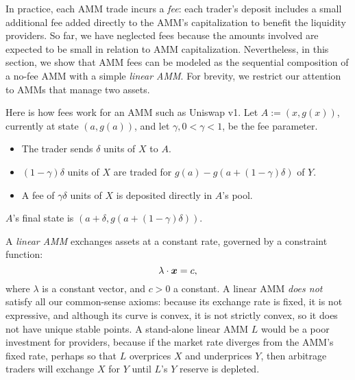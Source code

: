 In practice, each AMM trade incurs a \emph{fee}:
each trader's deposit includes a small additional fee
added directly to the AMM's capitalization to benefit the liquidity providers.
So far, we have neglected fees because the amounts involved
are expected to be small in relation to AMM capitalization.
Nevertheless, in this section,
we show that AMM fees can be modeled as the sequential composition
of a no-fee AMM with a simple \emph{linear AMM}.
For brevity, we restrict our attention to AMMs that manage two assets.

Here is how fees work for an AMM such as Uniswap v1.
Let $A := (x,g(x))$, currently at state $(a,g(a))$,
and let $\gamma, 0 < \gamma < 1$, be the fee parameter.
\begin{itemize}
\item
  The trader sends $\delta$ units of $X$ to $A$.
\item
  $(1-\gamma)\delta$ units of $X$ are traded for $g(a) - g(a +(1-\gamma)\delta)$ of $Y$.
\item
  A fee of $\gamma \delta$ units of $X$ is deposited directly in $A$'s pool.
\end{itemize}
$A$'s final state is $(a + \delta, g(a + (1-\gamma)\delta))$.

A \emph{linear AMM} exchanges assets at a constant rate,
governed by a constraint function:
\begin{equation*}
  \lambda \cdot {\boldsymbol x} = c,
\end{equation*}
where $\lambda$ is a constant vector, and $c > 0$ a constant.
A linear AMM \emph{does not} satisfy all our common-sense axioms:
because its exchange rate is fixed, it is not expressive,
and although its curve is convex, it is not strictly convex,
so it does not have unique stable points.
A stand-alone linear AMM $L$ would be a poor investment for providers,
because if the market rate diverges from the AMM's fixed rate,
perhaps so that $L$ overprices $X$ and underprices $Y$,
then arbitrage traders will exchange $X$ for $Y$ until $L$'s $Y$ reserve is depleted.

